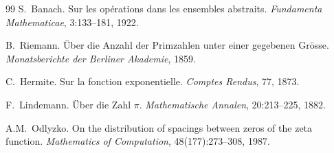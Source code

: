 \documentclass[11pt,a4paper]{article}
\theoremstyle{remark}
\begin{document}
\begin{thebibliography}{99}
S.~Banach.
\newblock Sur les opérations dans les ensembles abstraits.
\newblock \textit{Fundamenta Mathematicae}, 3:133--181, 1922.

B.~Riemann.
\newblock \"Uber die Anzahl der Primzahlen unter einer gegebenen Gr\"osse.
\newblock \textit{Monatsberichte der Berliner Akademie}, 1859.

C.~Hermite.
\newblock Sur la fonction exponentielle.
\newblock \textit{Comptes Rendus}, 77, 1873.

F.~Lindemann.
\newblock \"Uber die Zahl $\pi$.
\newblock \textit{Mathematische Annalen}, 20:213--225, 1882.

A.M.~Odlyzko.
\newblock On the distribution of spacings between zeros of the zeta function.
\newblock \textit{Mathematics of Computation}, 48(177):273--308, 1987.

\end{thebibliography}
\end{document}
